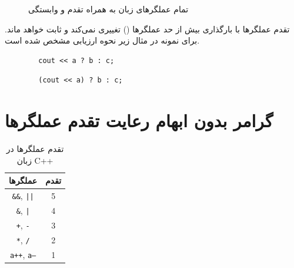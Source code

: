\documentclass[12pt, a4paper]{report}
\begin{document}
\begin{figure}[h!]
	\centering
	\caption{تمام عملگرهای زبان  به همراه تقدم و وابستگی}
	\label{fig:example}
\end{figure}

تقدم عملگر‌ها با بارگذاری بیش از حد عملگر‌ها () تغییری نمی‌کند و ثابت خواهد ماند.
برای نمونه در مثال زیر نحوه ارزیابی مشخص شده است.

\begin{LTR} %
	\begin{lstlisting}
		cout << a ? b : c;
	\end{lstlisting}
\end{LTR}

\begin{LTR} %
	\begin{lstlisting}
		(cout << a) ? b : c;
	\end{lstlisting}
\end{LTR}
\section{گرامر بدون ابهام رعایت تقدم عملگر‌ها}

\begin{table}[h!]
	\centering
	\begin{tabular}{|c|c|}
		\hline
		\textbf{عملگرها} & \textbf{تقدم} \\
		\hline
		\texttt{\&\&}, \texttt{||} & 5 \\
		\hline
		\texttt{\&}, \texttt{|} & 4 \\
		\hline
		\texttt{+}, \texttt{-} & 3 \\
		\hline
		\texttt{*}, \texttt{/} & 2 \\
		\hline
		\texttt{a++}, \texttt{a--} & 1 \\
		\hline
	\end{tabular}
	\caption{تقدم عملگرها در زبان C++}
	\label{tab:operator_precedence}
\end{table}
\end{document}
